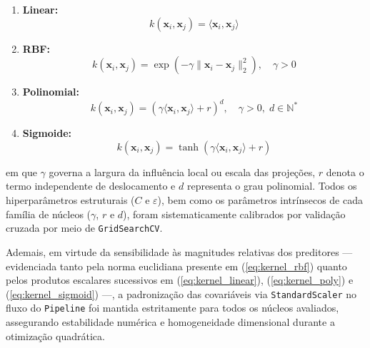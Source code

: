 \begin{enumerate}
    \item \textbf{Linear:}
    \begin{equation}
        k(\mathbf{x}_i, \mathbf{x}_j) = \langle \mathbf{x}_i, \mathbf{x}_j \rangle \label{eq:kernel_linear}
    \end{equation}
    
    \item \textbf{\gls{RBF}:}
    \begin{equation}
        k(\mathbf{x}_i, \mathbf{x}_j) = \exp\left(-\gamma \|\mathbf{x}_i - \mathbf{x}_j\|_2^2\right), \quad \gamma > 0 \label{eq:kernel_rbf}
    \end{equation}
    
    \item \textbf{Polinomial:}
    \begin{equation}
        k(\mathbf{x}_i, \mathbf{x}_j) = \left(\gamma \langle \mathbf{x}_i, \mathbf{x}_j \rangle + r\right)^d, \quad \gamma > 0, \; d \in \mathbb{N}^* \label{eq:kernel_poly}
    \end{equation}
    
    \item \textbf{Sigmoide:}
    \begin{equation}
        k(\mathbf{x}_i, \mathbf{x}_j) = \tanh\left(\gamma \langle \mathbf{x}_i, \mathbf{x}_j \rangle + r\right) \label{eq:kernel_sigmoid}
    \end{equation}
\end{enumerate}

\noindent em que $\gamma$ governa a largura da influência local ou escala das projeções, $r$ denota o termo independente de deslocamento e $d$ representa o grau polinomial. Todos os hiperparâmetros estruturais ($C$ e $\varepsilon$), bem como os parâmetros intrínsecos de cada família de núcleos ($\gamma$, $r$ e $d$), foram sistematicamente calibrados por validação cruzada por meio de \texttt{GridSearchCV}. 

Ademais, em virtude da sensibilidade às magnitudes relativas dos preditores — evidenciada tanto pela norma euclidiana presente em (\ref{eq:kernel_rbf}) quanto pelos produtos escalares sucessivos em (\ref{eq:kernel_linear}), (\ref{eq:kernel_poly}) e (\ref{eq:kernel_sigmoid}) —, a padronização das covariáveis via \texttt{StandardScaler} no fluxo do \texttt{Pipeline} foi mantida estritamente para todos os núcleos avaliados, assegurando estabilidade numérica e homogeneidade dimensional durante a otimização quadrática.

